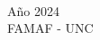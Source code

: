 \documentclass[a4paper,12pt,twoside,spanish,reqno,dottedtoc]{scrbook}
\begin{document}
    
    \begin{titlepage}
        
        \begin{addmargin}[-1cm]{-3cm} 
            \begin{center} 
                \large
                
                \hfill
                \vfill
                
                \begingroup
                \color{Maroon} \\ \bigskip %
                \endgroup
                
                
                \vfill
                
        
                
                Año 2024   \\ FAMAF  - UNC\\ \medskip %
                
                
                \vfill
                
            \end{center}
        \end{addmargin}
        
    \end{titlepage}
    

 
    
    \begingroup

    \let\clearpage\relax
    \let\cleardoublepage\relax
    \let\cleardoublepage\relax
 
   
    
    \setcounter{chapter}{0}
    \cleardoublepage
        
     
\end{document}
